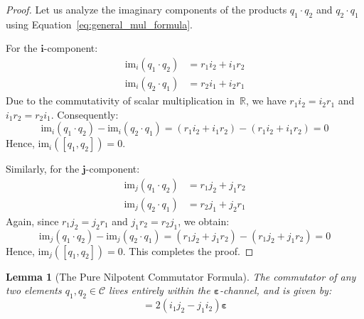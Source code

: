 \documentclass[11pt,a4paper]{book}
\newtheorem{lemma}[theorem]{Lemma}
\begin{document}
\begin{proof}
Let us analyze the imaginary components of the products $q_1 \cdot q_2$ and $q_2 \cdot q_1$ using Equation~\ref{eq:general_mul_formula}.

For the $\mathbf{i}$-component:
\begin{align}
\text{im}_i(q_1 \cdot q_2) &= r_1 i_2 + i_1 r_2 \\
\text{im}_i(q_2 \cdot q_1) &= r_2 i_1 + i_2 r_1
\end{align}
Due to the commutativity of scalar multiplication in~$\mathbb{R}$, we have $r_1 i_2 = i_2 r_1$ and $i_1 r_2 = r_2 i_1$. 
Consequently:
\begin{equation}
\text{im}_i(q_1 \cdot q_2) - \text{im}_i(q_2 \cdot q_1) = (r_1 i_2 + i_1 r_2) - (r_1 i_2 + i_1 r_2) = 0
\end{equation}
Hence, $\text{im}_i([q_1, q_2]) = 0$.

Similarly, for the $\mathbf{j}$-component:
\begin{align}
\text{im}_j(q_1 \cdot q_2) &= r_1 j_2 + j_1 r_2 \\
\text{im}_j(q_2 \cdot q_1) &= r_2 j_1 + j_2 r_1
\end{align}
Again, since $r_1 j_2 = j_2 r_1$ and $j_1 r_2 = r_2 j_1$, we obtain:
\begin{equation}
\text{im}_j(q_1 \cdot q_2) - \text{im}_j(q_2 \cdot q_1) = (r_1 j_2 + j_1 r_2) - (r_1 j_2 + j_1 r_2) = 0
\end{equation}
Hence, $\text{im}_j([q_1, q_2]) = 0$. 
This completes the proof.
\end{proof}

\begin{lemma}[The Pure Nilpotent Commutator Formula]
\label{lem:commutator_pure_epsilon}
The commutator of any two elements $q_1, q_2 \in \mathcal{C}$ lives entirely within the $\boldsymbol{\varepsilon}$-channel, and is given by:
\begin{equation}
[q_1, q_2] = 2\left(i_1 j_2 - j_1 i_2\right)\boldsymbol{\varepsilon}
\end{equation}
\end{lemma}
\end{document}
